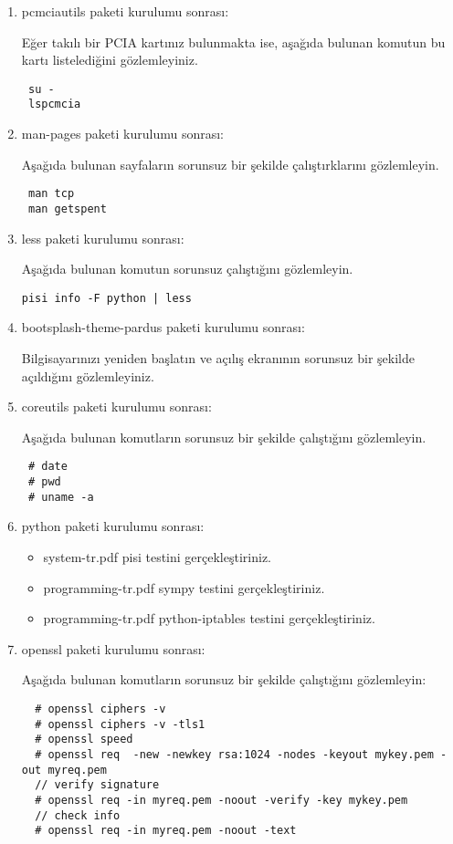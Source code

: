 \documentclass[a4paper,10pt]{article}
\begin{document}
\begin{enumerate}
\item pcmciautils paketi kurulumu sonrası:

Eğer takılı bir PCIA kartınız bulunmakta ise, aşağıda bulunan komutun bu kartı listelediğini gözlemleyiniz.
\begin{verbatim}
 su -
 lspcmcia
\end{verbatim}



\item man-pages paketi kurulumu sonrası:

Aşağıda bulunan sayfaların sorunsuz bir şekilde çalıştırklarını gözlemleyin.
\begin{verbatim}
 man tcp
 man getspent
\end{verbatim}


\item less paketi kurulumu sonrası:

Aşağıda bulunan komutun sorunsuz çalıştığını gözlemleyin.
\begin{verbatim}
pisi info -F python | less 
\end{verbatim}


\item bootsplash-theme-pardus paketi kurulumu sonrası:

Bilgisayarınızı yeniden başlatın ve açılış ekranının sorunsuz bir şekilde açıldığını gözlemleyiniz.

\item coreutils paketi kurulumu sonrası:

Aşağıda bulunan komutların sorunsuz bir şekilde çalıştığını gözlemleyin.
\begin{verbatim}
 # date
 # pwd
 # uname -a
\end{verbatim}


\item python paketi kurulumu sonrası:
\begin{itemize}
 \item system-tr.pdf pisi testini gerçekleştiriniz.
 \item programming-tr.pdf sympy testini gerçekleştiriniz.
 \item programming-tr.pdf python-iptables testini gerçekleştiriniz.
\end{itemize}


\item openssl paketi kurulumu sonrası:

Aşağıda bulunan komutların sorunsuz bir şekilde çalıştığını gözlemleyin:
\begin{verbatim}
  # openssl ciphers -v 
  # openssl ciphers -v -tls1
  # openssl speed
  # openssl req  -new -newkey rsa:1024 -nodes -keyout mykey.pem -out myreq.pem
  // verify signature
  # openssl req -in myreq.pem -noout -verify -key mykey.pem
  // check info
  # openssl req -in myreq.pem -noout -text


\end{verbatim}
\end{enumerate}
\end{document}
